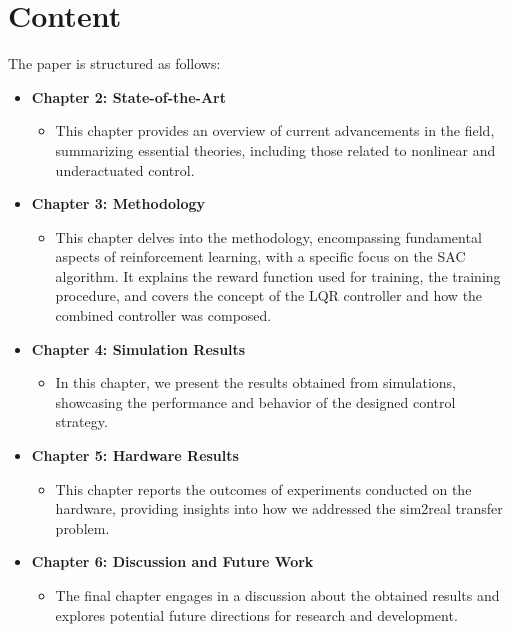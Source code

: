 \section{Content}
The paper is structured as follows:

\begin{itemize}
  \item \textbf{Chapter 2: State-of-the-Art}
  \begin{itemize}
    \item This chapter provides an overview of current advancements in the field, summarizing essential theories, including those related to nonlinear and underactuated control.
  \end{itemize}
  
  \item \textbf{Chapter 3: Methodology}
  \begin{itemize}
    \item This chapter delves into the methodology, encompassing fundamental aspects of reinforcement learning, with a specific focus on the SAC algorithm. It explains the reward function used for training, the training procedure, and covers the concept of the LQR controller and how the combined controller was composed.
  \end{itemize}
  
  \item \textbf{Chapter 4: Simulation Results}
  \begin{itemize}
    \item In this chapter, we present the results obtained from simulations, showcasing the performance and behavior of the designed control strategy.
  \end{itemize}
  
  \item \textbf{Chapter 5: Hardware Results}
  \begin{itemize}
    \item This chapter reports the outcomes of experiments conducted on the hardware, providing insights into how we addressed the sim2real transfer problem.
  \end{itemize}
  
  \item \textbf{Chapter 6: Discussion and Future Work}
  \begin{itemize}
    \item The final chapter engages in a discussion about the obtained results and explores potential future directions for research and development.
  \end{itemize}
\end{itemize}

\cleardoublepage
